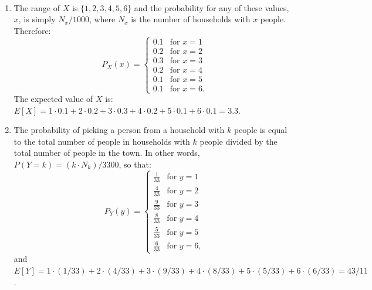 \begin{problem}{20} $ $

\begin{enumerate}

\item
The range of $X$ is $\{1, 2, 3, 4, 5, 6\}$ and the probability for any of these values, $x$, is simply $N_x/1000$, where $N_x$ is the number of households with $x$ people.  Therefore: 
\[
  P_X(x) =
  \begin{cases}
                                   0.1 & \text{for $x=1$} \\
                                   0.2 & \text{for $x=2$} \\
                                  0.3 & \text{for $x=3$} \\
                                   0.2 & \text{for $x=4$} \\
                                  0.1 & \text{for $x=5$} \\
                                  0.1 & \text{for $x=6$}.
  \end{cases}
\]
The expected value of $X$ is: $E[X] = 1\cdot 0.1+2\cdot 0.2+3\cdot 0.3+4\cdot 0.2+5\cdot 0.1+6\cdot 0.1 =3.3$.


\item The probability of picking a person from a household with $k$ people is equal to the total number of people in households with $k$ people divided by the total number of people in the town.  In other words, $P(Y=k)=(k\cdot N_k)/3300$, so that:
\[
  P_Y(y) =
  \begin{cases}
                                   \frac{1}{33} & \text{for $y=1$} \\
                                   \frac{4}{33} & \text{for $y=2$} \\
                                  \frac{9}{33} & \text{for $y=3$} \\
                                   \frac{8}{33} & \text{for $y=4$} \\
                                  \frac{5}{33} & \text{for $y=5$} \\
                                  \frac{6}{33} & \text{for $y=6$},
  \end{cases}
\]
and $E[Y] = 1\cdot (1/33)+2 \cdot (4/33)+3\cdot (9/33)+4\cdot (8/33)+5\cdot (5/33)+6\cdot (6/33) =43/11$.

\end{enumerate}

\end{problem}

